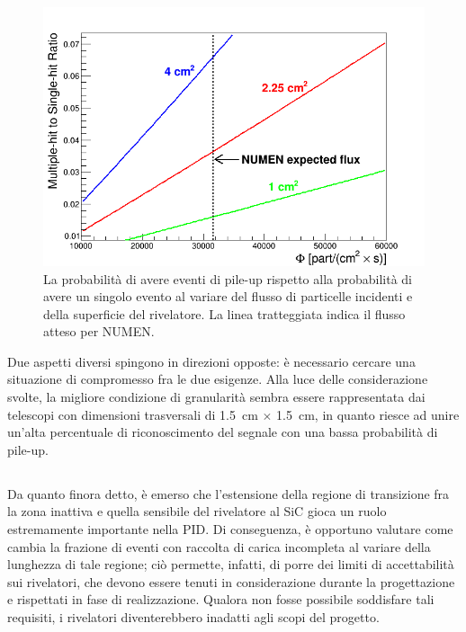 \begin{figure} [!t]
	\centering
	\includegraphics[scale=0.55]{Grafici_Tesi/Granularita/pile-up_label2.png}
	\caption{La probabilità di avere eventi di pile-up rispetto alla probabilità di avere un singolo evento al variare del flusso di particelle incidenti e della superficie del rivelatore. La linea tratteggiata indica il flusso atteso per NUMEN.} \label{fig:pile-up}
\end{figure}


Due aspetti diversi spingono in direzioni opposte: è necessario cercare una situazione di compromesso fra le due esigenze.
Alla luce delle considerazione svolte, la migliore condizione di granularità sembra essere rappresentata dai telescopi con dimensioni trasversali di 1.5~cm $\times$ 1.5~cm, in quanto riesce ad unire un'alta percentuale di riconoscimento del segnale con una bassa probabilità di pile-up.





\subsection{}

Da quanto finora detto, è emerso che l'estensione della regione di transizione fra la zona inattiva e quella sensibile del rivelatore al SiC gioca un ruolo estremamente importante nella PID.
Di conseguenza, è opportuno valutare come cambia la frazione di eventi con raccolta di carica incompleta al variare della lunghezza di tale regione; 
ciò permette, infatti, di porre dei limiti di accettabilità sui rivelatori, che devono essere tenuti in considerazione durante la progettazione e rispettati in fase di realizzazione.
Qualora non fosse possibile soddisfare tali requisiti, i rivelatori diventerebbero inadatti agli scopi del progetto.


